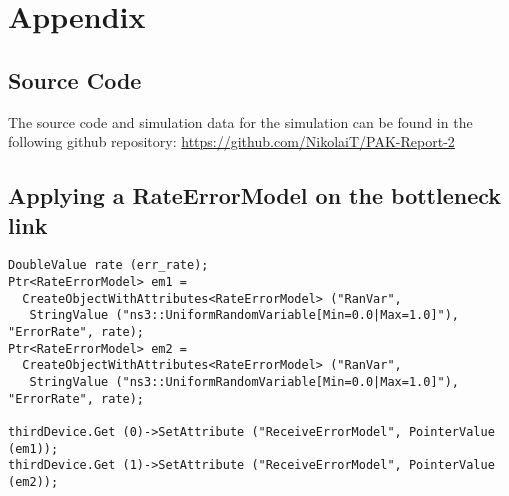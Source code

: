 


\newpage
\section*{Appendix} \label{appendix}

\subsection{Source Code}

The source code and simulation data for the simulation can be found in the following github repository:
\url{https://github.com/NikolaiT/PAK-Report-2}

\subsection{Applying a RateErrorModel on the bottleneck link}\label{errorModel}
\begin{lstlisting}
DoubleValue rate (err_rate);
Ptr<RateErrorModel> em1 =
  CreateObjectWithAttributes<RateErrorModel> ("RanVar",
   StringValue ("ns3::UniformRandomVariable[Min=0.0|Max=1.0]"), "ErrorRate", rate);
Ptr<RateErrorModel> em2 =
  CreateObjectWithAttributes<RateErrorModel> ("RanVar",
   StringValue ("ns3::UniformRandomVariable[Min=0.0|Max=1.0]"), "ErrorRate", rate);

thirdDevice.Get (0)->SetAttribute ("ReceiveErrorModel", PointerValue (em1));
thirdDevice.Get (1)->SetAttribute ("ReceiveErrorModel", PointerValue (em2));
\end{lstlisting}